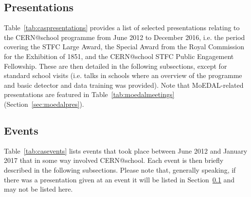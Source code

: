 \begin{landscape}



\end{landscape}



\clearpage

\subsection{Presentations}
\label{sec:caspresentations}
Table~\ref{tab:caspresentations} provides a list of selected presentations
relating to the CERN@school programme from June 2012 to December 2016,
i.e. the period covering the STFC Large Award, the Special Award from
the Royal Commission for the Exhibition of 1851, and the
CERN@school STFC Public Engagement Fellowship.
These are then detailed in the following subsections,
except for standard school visits (i.e. talks in schools where an overview of
the programme and basic detector and data training was provided).
Note that MoEDAL-related presentations are featured in
Table~\ref{tab:moedalmeetings} (Section~\ref{sec:moedalpres}).



\clearpage



\clearpage

\subsection{Events}
\label{sec:casevents}
Table~\ref{tab:casevents} lists events that took place between
June 2012 and January 2017 that in some way involved CERN@school.
Each event is then briefly described in the following subsections.
Please note that,
generally speaking,
if there was a presentation given at an event
it will be listed in Section~\ref{sec:caspresentations}
and may not be listed here.



\clearpage

